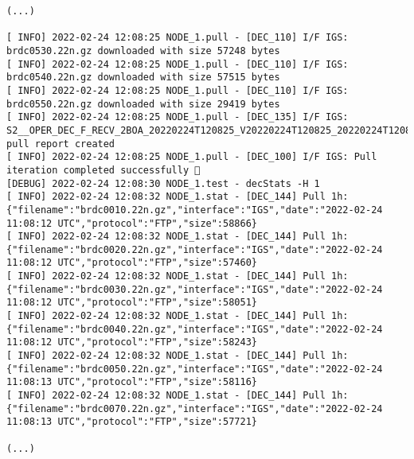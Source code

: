 \documentclass[dec_sum_main.tex]{subfiles}
\begin{document}
\begin{Verbatim}[fontsize=\tiny]
(...)

[ INFO] 2022-02-24 12:08:25 NODE_1.pull - [DEC_110] I/F IGS: brdc0530.22n.gz downloaded with size 57248 bytes
[ INFO] 2022-02-24 12:08:25 NODE_1.pull - [DEC_110] I/F IGS: brdc0540.22n.gz downloaded with size 57515 bytes
[ INFO] 2022-02-24 12:08:25 NODE_1.pull - [DEC_110] I/F IGS: brdc0550.22n.gz downloaded with size 29419 bytes
[ INFO] 2022-02-24 12:08:25 NODE_1.pull - [DEC_135] I/F IGS: S2__OPER_DEC_F_RECV_2BOA_20220224T120825_V20220224T120825_20220224T120825_IGS.xml pull report created
[ INFO] 2022-02-24 12:08:25 NODE_1.pull - [DEC_100] I/F IGS: Pull iteration completed successfully 🕺
[DEBUG] 2022-02-24 12:08:30 NODE_1.test - decStats -H 1
[ INFO] 2022-02-24 12:08:32 NODE_1.stat - [DEC_144] Pull 1h: {"filename":"brdc0010.22n.gz","interface":"IGS","date":"2022-02-24 11:08:12 UTC","protocol":"FTP","size":58866}
[ INFO] 2022-02-24 12:08:32 NODE_1.stat - [DEC_144] Pull 1h: {"filename":"brdc0020.22n.gz","interface":"IGS","date":"2022-02-24 11:08:12 UTC","protocol":"FTP","size":57460}
[ INFO] 2022-02-24 12:08:32 NODE_1.stat - [DEC_144] Pull 1h: {"filename":"brdc0030.22n.gz","interface":"IGS","date":"2022-02-24 11:08:12 UTC","protocol":"FTP","size":58051}
[ INFO] 2022-02-24 12:08:32 NODE_1.stat - [DEC_144] Pull 1h: {"filename":"brdc0040.22n.gz","interface":"IGS","date":"2022-02-24 11:08:12 UTC","protocol":"FTP","size":58243}
[ INFO] 2022-02-24 12:08:32 NODE_1.stat - [DEC_144] Pull 1h: {"filename":"brdc0050.22n.gz","interface":"IGS","date":"2022-02-24 11:08:13 UTC","protocol":"FTP","size":58116}
[ INFO] 2022-02-24 12:08:32 NODE_1.stat - [DEC_144] Pull 1h: {"filename":"brdc0070.22n.gz","interface":"IGS","date":"2022-02-24 11:08:13 UTC","protocol":"FTP","size":57721}

(...)


\end{Verbatim}
\end{document}
